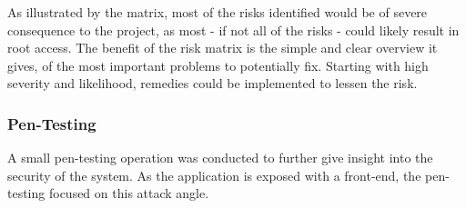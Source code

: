 \begin{table}[!h]
\centering
\caption{Risk Matrix}
\label{tab:table}
\end{table}

As illustrated by the matrix, most of the risks identified would be of severe consequence to the project, as most - if not all of the risks - could likely result in root access. The benefit of the risk matrix is the simple and clear overview it gives, of the most important problems to potentially fix. Starting with high severity and likelihood, remedies could be implemented to lessen the risk. 

\subsubsection{Pen-Testing}
A small pen-testing operation was conducted to further give insight into the security of the system. As the application is exposed with a front-end, the pen-testing focused on this attack angle. 

